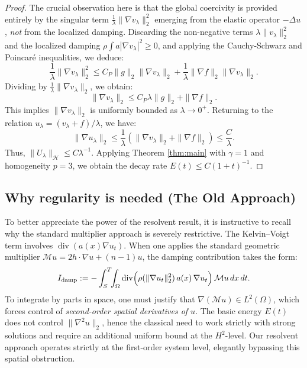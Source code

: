 \documentclass[11pt,reqno]{amsart}
\theoremstyle{remark}
\begin{document}
\begin{proof}
    The crucial observation here is that the global coercivity is provided entirely by the singular term $\frac{1}{\lambda}\|\nabla v_\lambda\|_2^2$ emerging from the elastic operator $-\Delta u$, \textit{not} from the localized damping. Discarding the non-negative terms $\lambda \|v_\lambda\|_2^2$ and the localized damping $\rho \int a |\nabla v_\lambda|^2 \ge 0$, and applying the Cauchy-Schwarz and Poincaré inequalities, we deduce:
    \begin{equation*}
        \frac{1}{\lambda} \|\nabla v_\lambda\|_2^2 \le C_P \|g\|_2 \|\nabla v_\lambda\|_2 + \frac{1}{\lambda} \|\nabla f\|_2 \|\nabla v_\lambda\|_2.
    \end{equation*}
    Dividing by $\frac{1}{\lambda}\|\nabla v_\lambda\|_2$, we obtain:
    \begin{equation*}
        \|\nabla v_\lambda\|_2 \le C_P \lambda \|g\|_2 + \|\nabla f\|_2.
    \end{equation*}
    This implies $\|\nabla v_\lambda\|_2$ is uniformly bounded as $\lambda \to 0^+$. Returning to the relation $u_\lambda = (v_\lambda+f)/\lambda$, we have:
    \begin{equation*}
        \|\nabla u_\lambda\|_2 \le \frac{1}{\lambda} (\|\nabla v_\lambda\|_2 + \|\nabla f\|_2) \le \frac{C}{\lambda}.
    \end{equation*}
    Thus, $\|U_\lambda\|_{\mathcal{H}} \le C \lambda^{-1}$. Applying Theorem \ref{thm:main} with $\gamma=1$ and homogeneity $p=3$, we obtain the decay rate $E(t) \le C (1+t)^{-1}$.
\end{proof}






\subsection{Why regularity is needed (The Old Approach)}

To better appreciate the power of the resolvent result, it is instructive to recall why the standard multiplier approach is severely restrictive. The Kelvin--Voigt term involves $\operatorname{div}(a(x)\nabla u_t)$. When one applies the standard geometric multiplier $\mathcal M u = 2h\cdot\nabla u + (n-1)u$, the damping contribution takes the form:
\[
I_{\rm damp} := -\int_S^T\!\!\int_\Omega \operatorname{div}\!\Big(\rho(\|\nabla u_t\|_2^2)\,a(x)\,\nabla u_t\Big)\,\mathcal M u\,dx\,dt.
\]
To integrate by parts in space, one must justify that $\nabla(\mathcal M u) \in L^2(\Omega)$, which forces control of \emph{second-order spatial derivatives of $u$}. The basic energy $E(t)$ does not control $\|\nabla^2 u\|_2$, hence the classical need to work strictly with strong solutions and require an additional uniform bound at the $H^2$-level. Our resolvent approach operates strictly at the first-order system level, elegantly bypassing this spatial obstruction.
\end{document}
